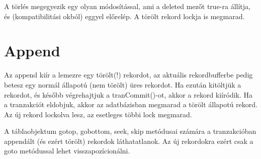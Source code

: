 A törlés megegyezik egy olyan módosítással, ami a deleted mezőt true-ra
állítja, és (kompatibilitási okból) eggyel előrelép. A törölt rekord
lockja is megmarad.

 

\section{Append} 
Az append kiír a lemezre egy törölt(!) rekordot, az aktuális rekordbufferbe
pedig betesz egy normál állapotú (nem törölt) üres rekordot.
Ha ezután kitöltjük a rekordot, és később végrehajtjuk a tranCommit()-ot, 
akkor a rekord kiíródik. Ha a tranzakciót eldobjuk, akkor az adatbázisban
megmarad a törölt állapotú rekord. Az új rekord lockolva lesz, 
az esetleges többi lock megmarad.

A táblaobjektum gotop, gobottom, seek, skip metódusai számára 
a tranzakcióban appendált (és ezért törölt) rekordok láthatatlanok. 
Az új rekordokra ezért csak a goto metódussal lehet visszapozícionálni.


